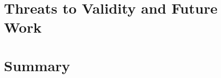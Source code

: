 \documentclass[draft,final]{vutinfth} %
\begin{document}
%

\chapter{Threats to Validity and Future Work}
\label{chap:threats}


\chapter{Summary}
\label{chap:summary}


\backmatter




\printindex

\printglossaries



\end{document}
